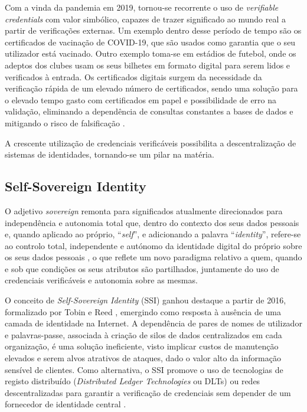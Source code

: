 Com a vinda da pandemia em 2019, tornou-se recorrente o uso de \textit{verifiable credentials} com valor simbólico, capazes de trazer significado ao mundo real a partir de verificações externas. Um exemplo dentro desse período de tempo são os certificados de vacinação de COVID-19, que são usados como garantia que o seu utilizador está vacinado. Outro exemplo toma-se em estádios de futebol, onde os adeptos dos clubes usam os seus bilhetes em formato digital para serem lidos e verificados à entrada. Os certificados digitais surgem da necessidade da verificação rápida de um elevado número de certificados, sendo uma solução para o elevado tempo gasto com certificados em papel e possibilidade de erro na validação, eliminando a dependência de consultas constantes a bases de dados e mitigando o risco de falsificação \cite{sedlmeir2021digital}.

A crescente utilização de credenciais verificáveis possibilita a descentralização de sistemas de identidades, tornando-se um pilar na matéria.

\subsection{Self-Sovereign Identity}

O adjetivo \textit{sovereign} remonta para significados atualmente direcionados para independência e autonomia total que, dentro do contexto dos seus dados pessoais e, quando aplicado ao próprio, “\textit{self}”, e adicionando a palavra “\textit{identity}”, refere-se ao controlo total, independente e autónomo da identidade digital do próprio sobre os seus dados pessoais \cite{preukschat2021self}, o que reflete um novo paradigma relativo a quem, quando e sob que condições os seus atributos são partilhados, juntamente do uso de credenciais verificáveis e autonomia sobre as mesmas.

O conceito de \textit{Self-Sovereign Identity} (SSI) ganhou destaque a partir de 2016, formalizado por Tobin e Reed \cite{tobin2016inevitable}, emergindo como resposta à ausência de uma camada de identidade na Internet. A dependência de pares de nomes de utilizador e palavras-passe, associada à criação de silos de dados centralizados em cada organização, é uma solução ineficiente, visto implicar custos de manutenção elevados e serem alvos atrativos de ataques, dado o valor alto da informação sensível de clientes. Como alternativa, o SSI promove o uso de tecnologias de registo distribuído (\textit{Distributed Ledger Technologies} ou DLTs) ou redes descentralizadas para garantir a verificação de credenciais sem depender de um fornecedor de identidade central \cite{tobin2016inevitable}.

